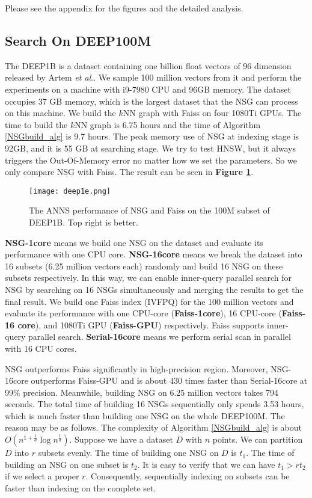\documentclass{vldb}
\def\etal{\emph{et al}.}
\begin{document}
Please see the appendix for the figures and the detailed analysis. 

\subsection{Search On DEEP100M}
The DEEP1B is a dataset containing one billion float vectors of 96 dimension released by Artem \etal \cite{babenko2016efficient}. We sample 100 million vectors from it and perform the experiments on a machine with i9-7980 CPU and 96GB memory. The dataset occupies 37 GB memory, which is the largest dataset that the NSG can process on this machine. We build the $k$NN graph with Faiss \cite{johnson2017billion} on four 1080Ti GPUs. The time to build the $k$NN graph is 6.75 hours and the time of Algorithm \ref{NSGbuild_alg} is 9.7 hours. The peak memory use of NSG at indexing stage is 92GB, and it is 55 GB at searching stage. We try to test HNSW, but it always triggers the Out-Of-Memory error no matter how we set the parameters. So we only compare NSG with Faiss. The result can be seen in \textbf{Figure \ref{deep1e}}.

\begin{figure}[t]
\begin{center}
\texttt{[image: deep1e.png]}
\end{center}
   \caption{The ANNS performance of NSG and Faiss on the 100M subset of DEEP1B. Top right is better.}
\label{deep1e}
\end{figure}

\textbf{NSG-1core} means we build one NSG on the dataset and evaluate its performance with one CPU core. \textbf{NSG-16core} means we break the dataset into 16 subsets (6.25 million vectors each) randomly and build 16 NSG on these subsets respectively. In this way, we can enable inner-query parallel search for NSG by searching on 16 NSGs simultaneously and merging the results to get the final result. We build one Faiss index (IVFPQ) for the 100 million vectors and evaluate its performance with one CPU-core (\textbf{Faiss-1core}), 16 CPU-core (\textbf{Faiss-16 core}), and 1080Ti GPU (\textbf{Faiss-GPU}) respectively. Faiss supports inner-query parallel search. \textbf{Serial-16core} means we perform serial scan in parallel with 16 CPU cores. 

NSG outperforms Faiss significantly in high-precision region. Moreover, NSG-16core outperforms Faiss-GPU and is about 430 times faster than Serial-16core at 99\% precision. Meanwhile, building NSG on 6.25 million vectors takes 794 seconds. The total time of building 16 NSGs sequentially only spends 3.53 hours, which is much faster than building one NSG on the whole DEEP100M. The reason may be as follows. The complexity of Algorithm \ref{NSGbuild_alg} is about $O(n^{1+\frac{1}{d}}\log n^{\frac{1}{d}})$. Suppose we have a dataset $D$ with $n$ points. We can partition $D$ into $r$ subsets evenly. The time of building one NSG on $D$ is $t_1$. The time of building an NSG on one subset is $t_2$. It is easy to verify that we can have $t_1 > rt_2$ if we select a proper $r$. Consequently, sequentially indexing on subsets can be faster than indexing on the complete set.
\end{document}

